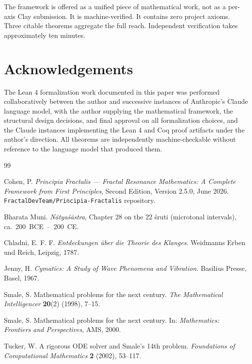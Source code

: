 \documentclass[11pt,a4paper]{article}
\theoremstyle{definition}
\begin{document}
The framework is offered as a unified piece of mathematical work,
not as a per-axis Clay submission. It is machine-verified.
It contains zero project axioms. Three citable theorems aggregate
the full reach. Independent verification takes approximately ten
minutes.

\section*{Acknowledgements}

The Lean 4 formalization work documented in this paper was
performed collaboratively between the author and successive
instances of Anthropic's Claude language model, with the author
supplying the mathematical framework, the structural design
decisions, and final approval on all formalization choices, and
the Claude instances implementing the Lean 4 and Coq proof
artifacts under the author's direction. All theorems are
independently machine-checkable without reference to the language
model that produced them.

\begin{thebibliography}{99}

 Cohen, P. \emph{Principia Fractalis ---
Fractal Resonance Mathematics: A Complete Framework from First
Principles}, Second Edition, Version 2.5.0, June 2026.
\texttt{FractalDevTeam/Principia-Fractalis} repository.

 Bharata Muni. \emph{N\=atya\'s\=astra},
Chapter 28 on the 22 \'sruti (microtonal intervals),
ca.~200~BCE~--~200~CE.

 Chladni, E. F. F. \emph{Entdeckungen \"uber
die Theorie des Klanges}. Weidmanns Erben und Reich, Leipzig, 1787.

 Jenny, H. \emph{Cymatics: A Study of
Wave Phenomena and Vibration.} Basilius Presse, Basel, 1967.

 Smale, S. Mathematical
problems for the next century. \emph{The Mathematical Intelligencer}
\textbf{20}(2) (1998), 7--15.

 Smale, S. Mathematical problems for
the next century. In: \emph{Mathematics: Frontiers and Perspectives},
AMS, 2000.

 Tucker, W. A rigorous ODE solver and
Smale's 14th problem. \emph{Foundations of Computational
Mathematics} \textbf{2} (2002), 53--117.

\end{thebibliography}
\end{document}
